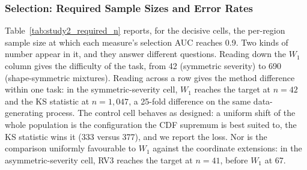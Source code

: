 \documentclass[AMA,Times1COL]{WileyNJDv5}
\begin{document}
\subsubsection{Selection: Required Sample Sizes and Error Rates}\label{sec:study2_selection}

Table~\ref{tab:study2_required_n} reports, for the decisive cells, the per-region sample size at which each measure's selection AUC reaches 0.9. Two kinds of number appear in it, and they answer different questions. Reading down the $W_1$ column gives the difficulty of the task, from 42 (symmetric severity) to 690 (shape-symmetric mixtures). Reading across a row gives the method difference within one task: in the symmetric-severity cell, $W_1$ reaches the target at $n = 42$ and the KS statistic at $n = 1{,}047$, a 25-fold difference on the same data-generating process. The control cell behaves as designed: a uniform shift of the whole population is the configuration the CDF supremum is best suited to, the KS statistic wins it (333 versus 377), and we report the loss. Nor is the comparison uniformly favourable to $W_1$ against the coordinate extensions: in the asymmetric-severity cell, RV3 reaches the target at $n = 41$, before $W_1$ at 67.
\end{document}

